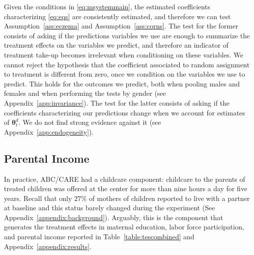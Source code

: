 Given the conditions in \eqref{eq:msystemmain}, the estimated coefficients characterizing \eqref{eq:eqs} are consistently estimated, and therefore we can test Assumption~\ref{ass:eczema} and Assumption~\ref{ass:corns}. The test for the former consists of asking if the predictions variables we use are enough to summarize the treatment effects on the variables we predict, and therefore an indicator of treatment take-up becomes irrelevant when conditioning on these variables. We cannot reject the hypothesis that the coefficient associated to random assignment to treatment is different from zero, once we condition on the variables we use to predict. This holds for the outcomes we predict, both when pooling males and females and when performing the tests by gender (see Appendix~\ref{app:invariance}). The test for the latter consists of asking if the coefficients characterizing our predictions change when we account for estimates of $\bm{\theta}_{t}^d$. We do not find strong evidence against it (see Appendix~\ref{app:endogeneity}).

\subsection{Parental Income} \label{section:pincome}

In practice, ABC/CARE had a childcare component: childcare to the parents of treated children was offered at the center for more than nine hours a day for five years. Recall that only $27\%$ of mothers of children reported to live with a partner at baseline and this status barely changed during the experiment (See Appendix~\ref{appendix:background}). Arguably, this is the component that generates the treatment effects in maternal education, labor force participation, and parental income reported in Table~\ref{table:tescombined} and Appendix~\ref{appendix:results}.

